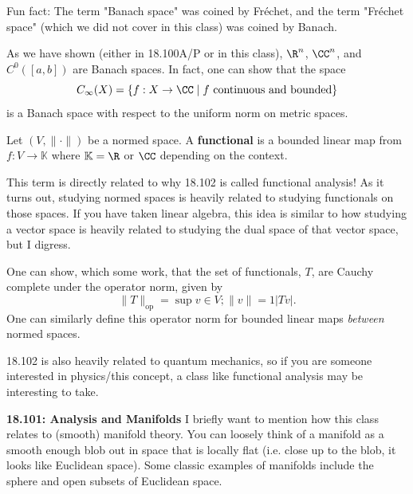 \begin{remark}
Fun fact: The term "Banach space" was coined by Fr\'echet, and the term "Fr\'echet space" (which we did not cover in this class) was coined by Banach.
\end{remark}

\begin{example}
As we have shown (either in 18.100A/P or in this class), $\R^n$, $\CC^n$, and $C^0([a,b])$ are Banach spaces. In fact, one can show that the space 
\[
C_\infty(X) = \{f:X \to \CC \mid f \text{ continuous and bounded}\}
\]
is a Banach space with respect to the uniform norm on metric spaces.
\end{example}

\begin{definition}[Functional]
Let $(V,\lVert \cdot \rVert)$ be a normed space. A \textbf{functional} is a bounded linear map from $f: V\to \mathbb K$ where $\mathbb K = \R$ or $\CC$ depending on the context.
\end{definition}

This term is directly related to why 18.102 is called functional analysis! As it turns out, studying normed spaces is heavily related to studying functionals on those spaces. If you have taken linear algebra, this idea is similar to how studying a vector space is heavily related to studying the dual space of that vector space, but I digress.

\begin{example}
    One can show, which some work, that the set of functionals, $T$, are Cauchy complete under the operator norm, given by 
    \[
    \lVert  T\rVert_{\text{op}} = \sup{v\in V; \lVert v \rVert = 1} |Tv|.
    \]
    One can similarly define this operator norm for bounded linear maps \textit{between} normed spaces.
\end{example}

\begin{remark}
    18.102 is also heavily related to quantum mechanics, so if you are someone interested in physics/this concept, a class like functional analysis may be interesting to take.
\end{remark}

\textbf{18.101: Analysis and Manifolds}
I briefly want to mention how this class relates to (smooth) manifold theory. You can loosely think of a manifold as a smooth enough blob out in space that is locally flat (i.e. close up to the blob, it looks like Euclidean space). Some classic examples of manifolds include the sphere and open subsets of Euclidean space.

